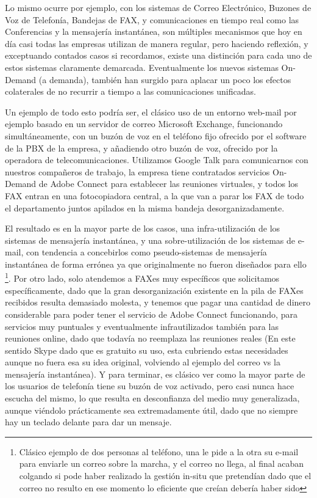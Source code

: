 Lo mismo ocurre por ejemplo, con los sistemas de Correo Electrónico, Buzones de Voz de Telefonía, Bandejas de FAX, y comunicaciones en tiempo real como las Conferencias y la mensajería instantánea, son múltiples mecanismos que hoy en día casi todas las empresas utilizan de manera regular, pero haciendo reflexión, y exceptuando contados casos si recordamos, existe una distinción para cada uno de estos sistemas claramente demarcada. Eventualmente los nuevos sistemas On-Demand (a demanda), también han surgido para aplacar un poco los efectos colaterales de no recurrir a tiempo a las comunicaciones unificadas. 

Un ejemplo de todo esto podría ser, el clásico uso de un entorno web-mail por ejemplo basado en un servidor de correo Microsoft Exchange, funcionando simultáneamente, con un buzón de voz en el teléfono fijo ofrecido por el software de la PBX de la empresa, y añadiendo otro buzón de voz, ofrecido por la operadora de telecomunicaciones. Utilizamos Google Talk para comunicarnos con nuestros compañeros de trabajo, la empresa tiene contratados servicios On-Demand de Adobe Connect para establecer las reuniones virtuales, y todos los FAX entran en una fotocopiadora central, a la que van a parar los FAX de todo el departamento juntos apilados en la misma bandeja desorganizadamente.

El resultado es en la mayor parte de los casos, una infra-utilización de los sistemas de mensajería instantánea, y una sobre-utilización de los sistemas de e-mail, con tendencia a concebirlos como pseudo-sistemas de mensajería instantánea de forma errónea ya que originalmente no fueron diseñados para ello \footnote{Clásico ejemplo de dos personas al teléfono, una le pide a la otra su e-mail para enviarle un correo sobre la marcha, y el correo no llega, al final acaban colgando si pode haber realizado la gestión in-situ que pretendían dado que el correo no resulto en ese momento lo eficiente que creían debería haber sido}. Por otro lado, solo atendemos a FAXes muy específicos que solicitamos específicamente, dado que la gran desorganización existente en la pila de FAXes recibidos resulta demasiado molesta, y tenemos que pagar una cantidad de dinero considerable para poder tener el servicio de Adobe Connect funcionando, para servicios muy puntuales y eventualmente infrautilizados también para las reuniones online, dado que todavía no reemplaza las reuniones reales (En este sentido Skype dado que es gratuito su uso, esta cubriendo estas necesidades aunque no fuera esa su idea original, volviendo al ejemplo del correo vs la mensajería instantánea). Y para terminar, es clásico ver como la mayor parte de los usuarios de telefonía tiene su buzón de voz activado, pero casi nunca hace escucha del mismo, lo que resulta en desconfianza del medio muy generalizada, aunque viéndolo prácticamente sea extremadamente útil, dado que no siempre hay un teclado delante para dar un mensaje.

